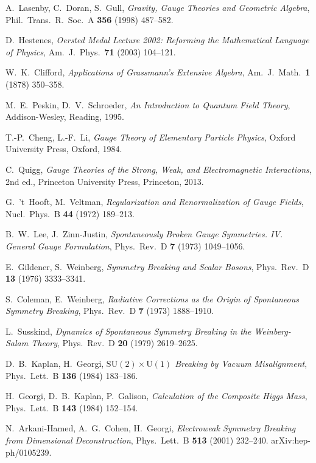\documentclass[11pt,a4paper]{article}
\newcommand{\SU}{\mathrm{SU}}
\newcommand{\U}{\mathrm{U}}
\theoremstyle{definition}
\theoremstyle{plain}
\theoremstyle{remark}
\begin{document}
\begin{thebibliography}{99}
A.~Lasenby, C.~Doran, S.~Gull, \emph{Gravity, Gauge Theories and Geometric Algebra}, Phil.\ Trans.\ R.\ Soc.\ A \textbf{356} (1998) 487--582.

D.~Hestenes, \emph{Oersted Medal Lecture 2002: Reforming the Mathematical Language of Physics}, Am.\ J.\ Phys.\ \textbf{71} (2003) 104--121.

W.~K.~Clifford, \emph{Applications of Grassmann's Extensive Algebra}, Am.\ J.\ Math.\ \textbf{1} (1878) 350--358.

M.~E.~Peskin, D.~V.~Schroeder, \emph{An Introduction to Quantum Field Theory}, Addison-Wesley, Reading, 1995.

T.-P.~Cheng, L.-F.~Li, \emph{Gauge Theory of Elementary Particle Physics}, Oxford University Press, Oxford, 1984.

C.~Quigg, \emph{Gauge Theories of the Strong, Weak, and Electromagnetic Interactions}, 2nd ed., Princeton University Press, Princeton, 2013.

G.~'t~Hooft, M.~Veltman, \emph{Regularization and Renormalization of Gauge Fields}, Nucl.\ Phys.\ B \textbf{44} (1972) 189--213.

B.~W.~Lee, J.~Zinn-Justin, \emph{Spontaneously Broken Gauge Symmetries. IV. General Gauge Formulation}, Phys.\ Rev.\ D \textbf{7} (1973) 1049--1056.

E.~Gildener, S.~Weinberg, \emph{Symmetry Breaking and Scalar Bosons}, Phys.\ Rev.\ D \textbf{13} (1976) 3333--3341.

S.~Coleman, E.~Weinberg, \emph{Radiative Corrections as the Origin of Spontaneous Symmetry Breaking}, Phys.\ Rev.\ D \textbf{7} (1973) 1888--1910.

L.~Susskind, \emph{Dynamics of Spontaneous Symmetry Breaking in the Weinberg-Salam Theory}, Phys.\ Rev.\ D \textbf{20} (1979) 2619--2625.

D.~B.~Kaplan, H.~Georgi, \emph{$\SU(2) \times \U(1)$ Breaking by Vacuum Misalignment}, Phys.\ Lett.\ B \textbf{136} (1984) 183--186.

H.~Georgi, D.~B.~Kaplan, P.~Galison, \emph{Calculation of the Composite Higgs Mass}, Phys.\ Lett.\ B \textbf{143} (1984) 152--154.

N.~Arkani-Hamed, A.~G.~Cohen, H.~Georgi, \emph{Electroweak Symmetry Breaking from Dimensional Deconstruction}, Phys.\ Lett.\ B \textbf{513} (2001) 232--240. arXiv:hep-ph/0105239.


\end{thebibliography}
\end{document}
